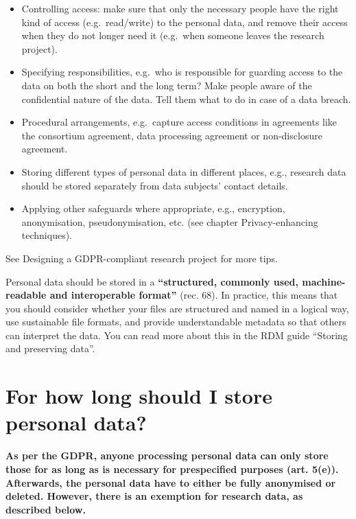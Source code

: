 \documentclass[
]{book}
\providecommand{\tightlist}{%
  \setlength{\itemsep}{0pt}\setlength{\parskip}{0pt}}
\begin{document}
\begin{itemize}
\tightlist
\item
  Controlling access: make sure that only the necessary people have the right
  kind of access (e.g.~read/write) to the personal data, and remove their access
  when they do not longer need it (e.g.~when someone leaves the research project).\\
\item
  Specifying responsibilities, e.g.~who is responsible for guarding access to the
  data on both the short and the long term? Make people aware of the confidential
  nature of the data. Tell them what to do in case of a
  data breach.
\item
  Procedural arrangements, e.g.~capture access conditions in
  agreements like the consortium agreement,
  data processing agreement or non-disclosure agreement.
\item
  Storing different types of personal data in different places, e.g., research
  data should be stored separately from data subjects' contact details.
\item
  Applying other safeguards where appropriate, e.g., encryption, anonymisation,
  pseudonymisation, etc. (see chapter Privacy-enhancing
  techniques).
\end{itemize}

See Designing a GDPR-compliant research project for more tips.

Personal data should be stored in a \textbf{``structured, commonly used, machine-readable
and interoperable format''} (rec. 68).
In practice, this means that you should consider whether your files are
structured and named in a logical way, use
sustainable file formats,
and provide understandable metadata so that others can interpret the data.
You can read more about this in the RDM guide
``Storing and preserving data''.

\hypertarget{data-storage-duration}{%
\section{For how long should I store personal data?}\label{data-storage-duration}}

\textbf{As per the GDPR, anyone processing personal data can only store those for as
long as is necessary for prespecified purposes
(art. 5(e)).
Afterwards, the personal data have to either be fully anonymised or deleted.
However, there is an exemption for research data, as described below.}
\end{document}
